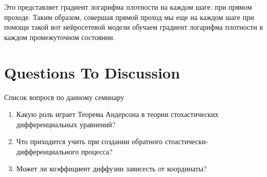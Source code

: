 Это представляет градиент логарифма плотности на каждом шаге. при прямом проходе. Таким образом, совершая прямой проход мы еще на каждом шаге при помощи такой вот нейросетевой модели обучаем градиент логарифма плотности в каждом промежуточном состоянии.

\section{Questions To Discussion}
Список вопросв по данному семинару
\begin{enumerate}
    \item  Какую роль играет Теорема Андерсона в теории стохастических дифференциальных уравнений?
    \item Что приходится учить при создании обратного стоастически-дифференциального процесса?
    \item Может ли коэффициент диффузии зависесть от координаты?
\end{enumerate}

 

